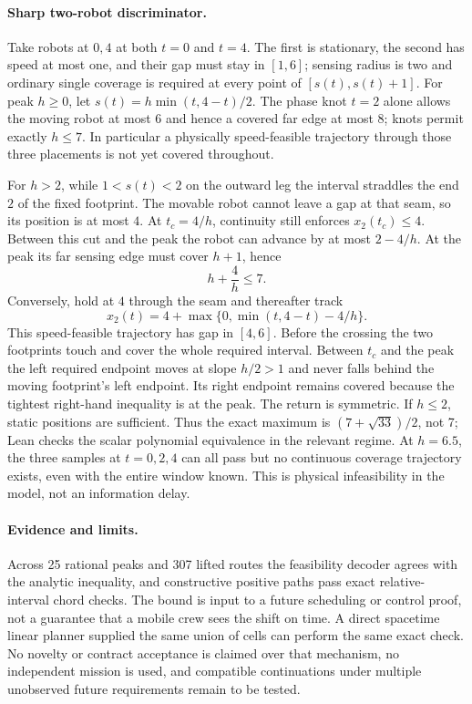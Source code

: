 \documentclass[11pt]{article}
\begin{document}
\paragraph{Sharp two-robot discriminator.}
Take robots at \(0,4\) at both \(t=0\) and \(t=4\).
The first is stationary, the second has speed at most one, and their
gap must stay in \([1,6]\); sensing radius is two and ordinary single
coverage is required at every point of \([s(t),s(t)+1]\).
For peak \(h\geq0\), let
\(s(t)=h\min(t,4-t)/2\). The phase knot \(t=2\) alone allows the
moving robot at most \(6\) and hence a covered far edge at most
\(8\); knots permit exactly \(h\le7\). In particular a physically
speed-feasible trajectory through those three placements is not
yet covered throughout.

For \(h>2\), while \(1<s(t)<2\) on the outward leg the interval
straddles the end \(2\) of the fixed footprint. The movable
robot cannot leave a gap at that seam, so its position is at most
\(4\). At \(t_c=4/h\), continuity still enforces \(x_2(t_c)\le4\).
Between this cut and the peak the robot can advance by at most
\(2-4/h\). At the peak its far sensing edge must cover \(h+1\),
hence
\[
 h+\frac4h\le 7.
\]
Conversely, hold at \(4\) through the seam and thereafter track
\[
 x_2(t)=4+\max\{0,\min(t,4-t)-4/h\}.
\]
This speed-feasible trajectory has gap in \([4,6]\).
Before the crossing the two footprints touch and cover the whole
required interval. Between \(t_c\) and the peak the left required
endpoint moves at slope \(h/2>1\) and never falls behind the
moving footprint's left endpoint. Its right endpoint remains
covered because the tightest right-hand inequality is at the
peak. The return is symmetric. If \(h\le2\), static positions
are sufficient. Thus the exact maximum is
\((7+\sqrt{33})/2\), not 7; Lean checks the scalar polynomial
equivalence in the relevant regime. At \(h=6.5\), the three
samples at \(t=0,2,4\) can all pass but no continuous coverage
trajectory exists, even with the entire window known. This is
physical infeasibility in the model, not an information delay.

\paragraph{Evidence and limits.}
Across 25 rational peaks and 307 lifted routes the feasibility
decoder agrees with the analytic inequality, and constructive
positive paths pass exact relative-interval chord checks.
The bound is input to a future scheduling or control proof, not a
guarantee that a mobile crew sees the shift on time. A direct
spacetime linear planner supplied the same union of cells can
perform the same exact check. No novelty or contract acceptance
is claimed over that mechanism, no independent mission is used,
and compatible continuations under multiple unobserved future
requirements remain to be tested.
\end{document}
